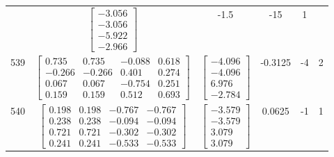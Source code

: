 \documentclass[a4paper,12pt]{article}
\begin{document}
\begin{tabular}{c c c c c c}
&
$\begin{bmatrix} -3.056 \\ -3.056 \\ -5.922 \\ -2.966 \end{bmatrix}$
&
-1.5
&
-15
&
1
\\
539
&
$\begin{bmatrix} 0.735 & 0.735 & -0.088 & 0.618 \\ -0.266 & -0.266 & 0.401 & 0.274 \\ 0.067 & 0.067 & -0.754 & 0.251 \\ 0.159 & 0.159 & 0.512 & 0.693 \end{bmatrix}$
&
$\begin{bmatrix} -4.096 \\ -4.096 \\ 6.976 \\ -2.784 \end{bmatrix}$
&
-0.3125
&
-4
&
2
\\
540
&
$\begin{bmatrix} 0.198 & 0.198 & -0.767 & -0.767 \\ 0.238 & 0.238 & -0.094 & -0.094 \\ 0.721 & 0.721 & -0.302 & -0.302 \\ 0.241 & 0.241 & -0.533 & -0.533 \end{bmatrix}$
&
$\begin{bmatrix} -3.579 \\ -3.579 \\ 3.079 \\ 3.079 \end{bmatrix}$
&
0.0625
&
-1
&
1
\\
\end{tabular} \egroup \newpage
\end{document}
